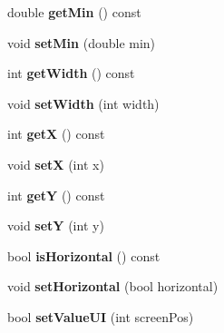 \begin{DoxyCompactItemize}
\item 
\hypertarget{class_slider_a1e896244a3456cd73ed6a15b099613c4}{}double {\bfseries get\+Min} () const \label{class_slider_a1e896244a3456cd73ed6a15b099613c4}

\item 
\hypertarget{class_slider_a3928cc8e14d3f0707721306893f6c838}{}void {\bfseries set\+Min} (double min)\label{class_slider_a3928cc8e14d3f0707721306893f6c838}

\item 
\hypertarget{class_slider_a7795bfcac92d4e15cbdc211f4491c326}{}int {\bfseries get\+Width} () const \label{class_slider_a7795bfcac92d4e15cbdc211f4491c326}

\item 
\hypertarget{class_slider_aa49137d24889b83a49b77bd060237278}{}void {\bfseries set\+Width} (int width)\label{class_slider_aa49137d24889b83a49b77bd060237278}

\item 
\hypertarget{class_slider_a7b088eb7c67e386db8b7a3ad60eccb6a}{}int {\bfseries get\+X} () const \label{class_slider_a7b088eb7c67e386db8b7a3ad60eccb6a}

\item 
\hypertarget{class_slider_a7d00227f6acc8326f845181ccfc7e0a2}{}void {\bfseries set\+X} (int x)\label{class_slider_a7d00227f6acc8326f845181ccfc7e0a2}

\item 
\hypertarget{class_slider_a8e193dacb39f493e9bd9f3527a36f0cc}{}int {\bfseries get\+Y} () const \label{class_slider_a8e193dacb39f493e9bd9f3527a36f0cc}

\item 
\hypertarget{class_slider_ae37e42aa2ac576b080b7258dbe418453}{}void {\bfseries set\+Y} (int y)\label{class_slider_ae37e42aa2ac576b080b7258dbe418453}

\item 
\hypertarget{class_slider_a83d87d20e8081183cfcb1e3280de05e4}{}bool {\bfseries is\+Horizontal} () const \label{class_slider_a83d87d20e8081183cfcb1e3280de05e4}

\item 
\hypertarget{class_slider_ac434719cecbc1ddc246f9f565b3bef29}{}void {\bfseries set\+Horizontal} (bool horizontal)\label{class_slider_ac434719cecbc1ddc246f9f565b3bef29}

\item 
\hypertarget{class_slider_a487abaeb6b222126010bd0bde03c19d3}{}bool {\bfseries set\+Value\+U\+I} (int screen\+Pos)\label{class_slider_a487abaeb6b222126010bd0bde03c19d3}


\end{DoxyCompactItemize}
